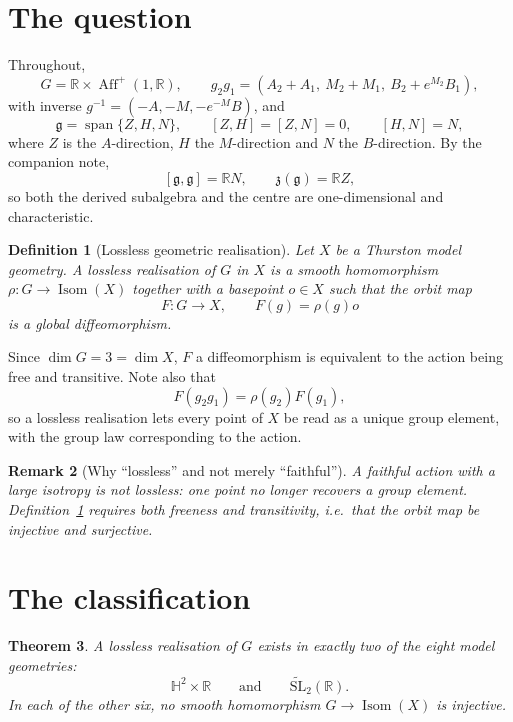 \documentclass[11pt]{article}
\newtheorem{theorem}{Theorem}[section]
\newtheorem{definition}[theorem]{Definition}
\newtheorem{remark}[theorem]{Remark}
\begin{document}
\section{The question}
\label{sec:question}

Throughout,
\[
G=\mathbb R\times\operatorname{Aff}^+(1,\mathbb R),\qquad
g_2g_1=(A_2+A_1,\ M_2+M_1,\ B_2+e^{M_2}B_1),
\]
with inverse $g^{-1}=(-A,-M,-e^{-M}B)$, and
\[
\mathfrak g=\operatorname{span}\{Z,H,N\},\qquad
[Z,H]=[Z,N]=0,\qquad [H,N]=N,
\]
where $Z$ is the $A$-direction, $H$ the $M$-direction and $N$ the $B$-direction.
By the companion note,
\[
[\mathfrak g,\mathfrak g]=\mathbb RN,\qquad \mathfrak z(\mathfrak g)=\mathbb RZ,
\]
so both the derived subalgebra and the centre are one-dimensional and
characteristic.

\begin{definition}[Lossless geometric realisation]
\label{def:lossless}
Let $X$ be a Thurston model geometry. A \emph{lossless realisation} of $G$ in
$X$ is a smooth homomorphism $\rho:G\to\operatorname{Isom}(X)$ together with a
basepoint $o\in X$ such that the orbit map
\[
F:G\longrightarrow X,\qquad F(g)=\rho(g)o
\]
is a global diffeomorphism.
\end{definition}

Since $\dim G=3=\dim X$, $F$ a diffeomorphism is equivalent to the action being
free and transitive. Note also that
\[
F(g_2g_1)=\rho(g_2)F(g_1),
\]
so a lossless realisation lets every point of $X$ be read as a unique group
element, with the group law corresponding to the action.

\begin{remark}[Why ``lossless'' and not merely ``faithful'']
\label{rem:why}
A faithful action with a large isotropy is not lossless: one point no longer
recovers a group element. Definition~\ref{def:lossless} requires both freeness
and transitivity, i.e.\ that the orbit map be injective \emph{and} surjective.
\end{remark}

\section{The classification}
\label{sec:classification}

\begin{theorem}
\label{thm:classification}
A lossless realisation of $G$ exists in exactly two of the eight model
geometries:
\[
\mathbb H^2\times\mathbb R
\qquad\text{and}\qquad
\widetilde{\mathrm{SL}}_2(\mathbb R).
\]
In each of the other six, no smooth homomorphism $G\to\operatorname{Isom}(X)$ is
injective.
\end{theorem}
\end{document}
